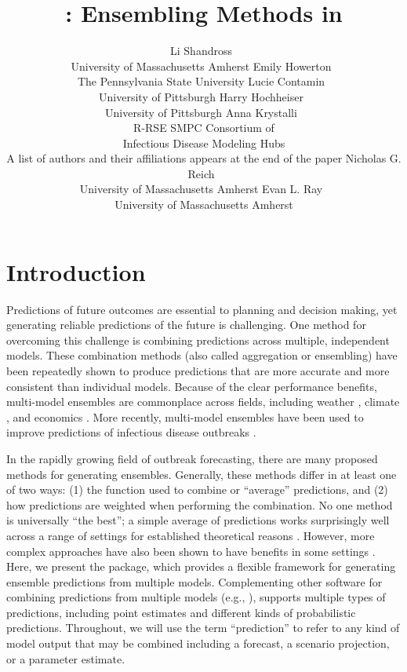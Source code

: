 \documentclass[
  article,
  shortnames,
  notitle]{jss}
\author{Li Shandross~\orcidlink{0009-0008-1348-1954}\\University of
Massachusetts Amherst \And Emily
Howerton~\orcidlink{0000-0002-0639-3728}\\The Pennsylvania State
University \AND Lucie
Contamin~\orcidlink{0000-0001-5797-1279}\\University of
Pittsburgh \And Harry
Hochheiser~\orcidlink{0000-0001-8793-9982}\\University of
Pittsburgh \AND Anna Krystalli~\orcidlink{0000-0002-2378-4915}\\R-RSE
SMPC \And Consortium of\\
Infectious Disease Modeling Hubs\\A list of authors and their
affiliations appears at the end of the paper \AND Nicholas G.
Reich~\orcidlink{0000-0003-3503-9899}\\University of Massachusetts
Amherst \And Evan L. Ray~\orcidlink{0000-0003-4035-0243}\\University of
Massachusetts Amherst}
\title{\pkg{hubEnsembles}: Ensembling Methods in \proglang{R}}
\begin{document}
\maketitle

\section{Introduction}\label{sec-intro}

Predictions of future outcomes are essential to planning and decision
making, yet generating reliable predictions of the future is
challenging. One method for overcoming this challenge is combining
predictions across multiple, independent models. These combination
methods (also called aggregation or ensembling) have been repeatedly
shown to produce predictions that are more accurate
\citep{clemen1989, timmermann2006b} and more consistent
\citep{hibon2005} than individual models. Because of the clear
performance benefits, multi-model ensembles are commonplace across
fields, including weather \citep{alley2019}, climate
\citep{tebaldi2007}, and economics \citep{aastveit2018}. More recently,
multi-model ensembles have been used to improve predictions of
infectious disease outbreaks
\citep{viboud2018, johansson2019, mcgowan2019, reich_accuracy_2019, cramer2022}.

In the rapidly growing field of outbreak forecasting, there are many
proposed methods for generating ensembles. Generally, these methods
differ in at least one of two ways: (1) the function used to combine or
``average'' predictions, and (2) how predictions are weighted when
performing the combination. No one method is universally ``the best''; a
simple average of predictions works surprisingly well across a range of
settings \citep{mcgowan2019, paireau_ensemble_2022, ray_comparing_2023}
for established theoretical reasons \citep{winkler2015}. However, more
complex approaches have also been shown to have benefits in some
settings
\citep{yamana_superensemble_2016, ray_prediction_2018, reich_accuracy_2019, colon-gonzalez_probabilistic_2021}.
Here, we present the  package, which provides a
flexible framework for generating ensemble predictions from multiple
models. Complementing other software for combining predictions from
multiple models (e.g.,
\citep{pedregosa_scikit-learn_2011, weiss2019, bosse_stackr_2023, couch_stacks_2023}),
 supports multiple types of predictions, including
point estimates and different kinds of probabilistic predictions.
Throughout, we will use the term ``prediction'' to refer to any kind of
model output that may be combined including a forecast, a scenario
projection, or a parameter estimate.
\end{document}
